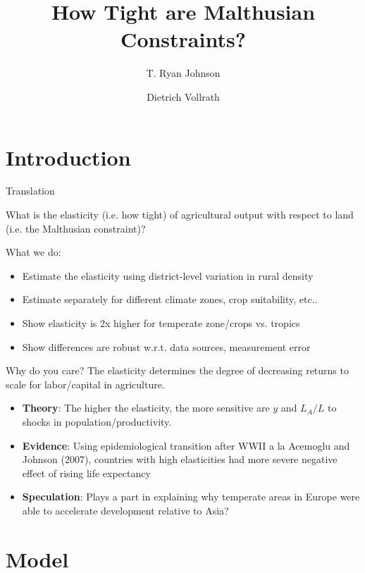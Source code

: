 \documentclass[10pt, xcolor=dvipsnames]{beamer}
\title[Land Constraints]{{How Tight are Malthusian Constraints?}}
\author[Johnson \& Vollrath]{T. Ryan Johnson \inst{1} \and Dietrich Vollrath \inst{2}}
\institute[UH]{\inst{1} University of Houston \and %
                      \inst{2} University of Houston}
\date[June 2017]{}
\begin{document}
\maketitle

\section{Introduction}

\begin{frame}{Translation}\label{define}

What is the elasticity (i.e. how tight) of agricultural output with respect to land (i.e. the Malthusian constraint)? 

What we do: 
\begin{itemize}
  \item Estimate the elasticity using district-level variation in rural density
  \item Estimate separately for different climate zones, crop suitability, etc..
  \item Show elasticity is 2x higher for temperate zone/crops vs. tropics
  \item Show differences are robust w.r.t. data sources, measurement error
\end{itemize}


\end{frame}


\begin{frame}{Why do you care?}
The elasticity determines the degree of decreasing returns to scale for labor/capital in agriculture. 

\begin{itemize}
  \item \textbf{Theory}: The higher the elasticity, the more sensitive are $y$ and $L_A/L$ to shocks in population/productivity.
  \item \textbf{Evidence}: Using epidemiological transition after WWII a la Acemoglu and Johnson (2007), countries with high elasticities had more severe negative effect of rising life expectancy
  \item \textbf{Speculation}: Plays a part in explaining why temperate areas in Europe were able to accelerate development relative to Asia? 
\end{itemize}

\end{frame}

\section{Model}
\end{document}
